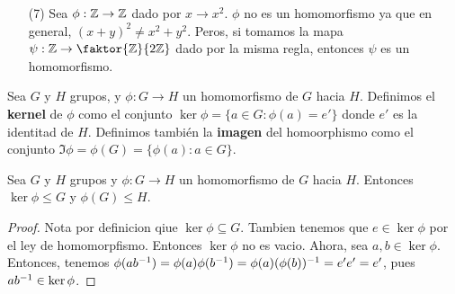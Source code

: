 \begin{example}
\begin{enumerate}
        \item[(7)] Sea $\phi:\mathbb{Z} \rightarrow \mathbb{Z}$ dado por $x \rightarrow x^2$.
            $\phi$ no es un homomorfismo ya que en general,  $(x+y)^2 \neq
            x^2+y^2$. Peros, si tomamos la mapa $\psi:\Z \rightarrow
            \faktor{\Z}{2\Z}$ dado por la misma regla, entonces $\psi$ es un
            homomorfismo.
    \end{enumerate}
\end{example}

\begin{definition}
    Sea $G$ y  $H$ grupos, y  $\phi:G \rightarrow H$ un homomorfismo de $G$
    hacia  $H$. Definimos el \textbf{kernel} de $\phi$ como el conjunto
    $\ker{\phi}=\{a \in G : \phi(a)=e'\}$ donde $e'$ es la identitad de  $H$.
    Definimos tambi\'en la  \textbf{imagen} del homoorphismo como el conjunto
    $\Im{\phi}=\phi(G)=\{\phi(a) : a \in G\}$.
\end{definition}

\begin{lemma}\label{}
    Sea $G$ y  $H$ grupos y $\phi:G \rightarrow H$ un homomorfismo de $G$ hacia
     $H$. Entonces  $\ker{\phi} \leq G$ y $\phi(G) \leq H$.
\end{lemma}
\begin{proof}
    Nota por definicion qiue $\ker{\phi} \subseteq G$. Tambien tenemos que $e
    \in \ker{\phi}$ por el ley de homomorpfismo. Entonces $\ker{\phi}$ no es
    vacio. Ahora, sea $a,b \in \ker{\phi}$. Entonces, tenemos
    $\phi(ab^{-1})=\phi(a)\phi(b^{-1})=\phi(a)(\phi(b))^{-1}=e'e'=e'$, pues
    $ab^{-1} \in \ker{\phi}$.
\end{proof}

